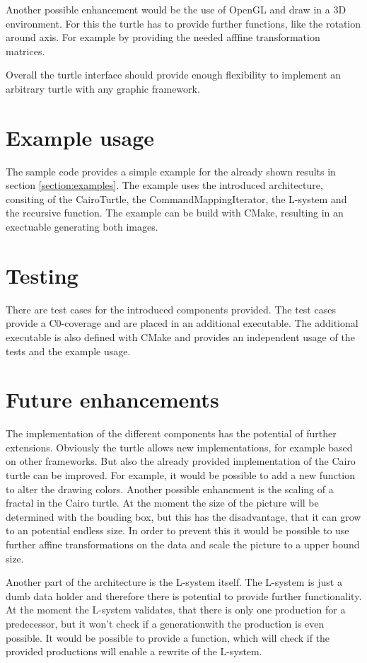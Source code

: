 \documentclass[english]{cpp-hmwk}
\begin{document}
Another possible enhancement would be the use of OpenGL and draw in a 3D environment. For this the turtle has to provide further functions, like the rotation around axis. For example by providing the needed afffine transformation matrices.

Overall the turtle interface should provide enough flexibility to implement an arbitrary turtle with any graphic framework.

\section{Example usage}
The sample code provides a simple example for the already shown results in section \ref{section:examples}. The example uses the introduced architecture, consiting of the CairoTurtle, the CommandMappingIterator, the L-system and the recursive function. The example can be build with CMake, resulting in an exectuable generating both images. 

\section{Testing}
\label{section:test}
There are test cases for the introduced components provided. The test cases provide a C0-coverage and are placed in an additional executable. The additional executable is also defined with CMake and provides an independent usage of the tests and the example usage.

\section{Future enhancements}

The implementation of the different components has the potential of further extensions. Obviously the turtle allows new implementations, for example based on other frameworks. But also the already provided implementation of the Cairo turtle can be improved. For example, it would be possible to add a new function to alter the drawing colors. Another possible enhancment is the scaling of a fractal in the Cairo turtle. At the moment the size of the picture will be determined with the bouding box, but this has the disadvantage, that it can grow to an potential endless size. In order to prevent this it would be possible to use further affine transformations on the data and scale the picture to a upper bound size.

\noindent Another part of the architecture is the L-system itself. The L-system is just a dumb data holder and therefore there is potential to provide further functionality. At the moment the L-system validates, that there is only one production for a predecessor, but it won't check if a generationwith the production is even possible. It would be possible to provide a function, which will check if the provided productions will enable a rewrite of the L-system. 
\end{document}
